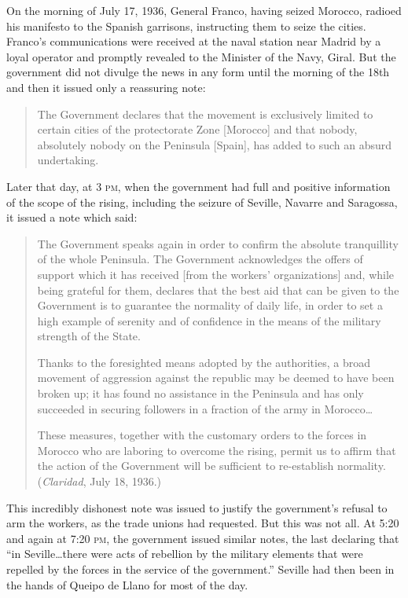 On the morning of July 17, 1936, General Franco{\indexFFranco}, having seized Morocco{}, radioed his manifesto to the Spanish garrisons, instructing them to seize the cities. Franco’s communications were received at the naval station near Madrid by a loyal operator and promptly revealed to the Minister of the Navy, Giral. But the government did not divulge the news in any form until the morning of the 18th and then it issued only a reassuring note:
\nowidow

\begin{quotation}
  The Government declares that the movement is exclusively limited to certain cities of the protectorate Zone [Morocco] and that nobody, absolutely nobody on the Peninsula [Spain], has added to such an absurd undertaking.
\end{quotation}

Later that day, at 3 \textsc{pm}, when the government had full and positive information of the scope of the rising, including the seizure of Seville, Navarre and Saragossa, it issued a note which said:

\begin{quotation}
  \begin{sloppypar}
  The Government speaks again in order to confirm the absolute tranquillity of the whole Peninsula. The Government acknowledges the offers of support which it has received [from the workers’ organizations] and, while being grateful for them, declares that the best aid that can be given to the Government is to guarantee the normality of daily life, in order to set a high example of serenity and of confidence in the means of the military strength of the State.
  \end{sloppypar}
  
  Thanks to the foresighted means adopted by the authorities, a broad movement of aggression against the republic may be deemed to have been broken up; it has found no assistance in the Peninsula and has only succeeded in securing followers in a fraction of the army in Morocco\ldots
  
  These measures, together with the customary orders to the forces in Morocco who are laboring to overcome the rising, permit us to affirm that the action of the Government will be sufficient to re-establish normality. (\emph{Claridad}{\indexClaridad}, July 18, 1936.)
\end{quotation}

This incredibly dishonest note was issued to justify the government’s refusal to arm the workers, as the trade unions had requested. But this was not all. At 5:20 and again at 7:20 \textsc{pm}, the government issued similar notes, the last declaring that ``in Seville\ldots there were acts of rebellion by the military elements that were repelled by the forces in the service of the government.'' Seville had then been in the hands of Queipo de Llano for most of the day.

